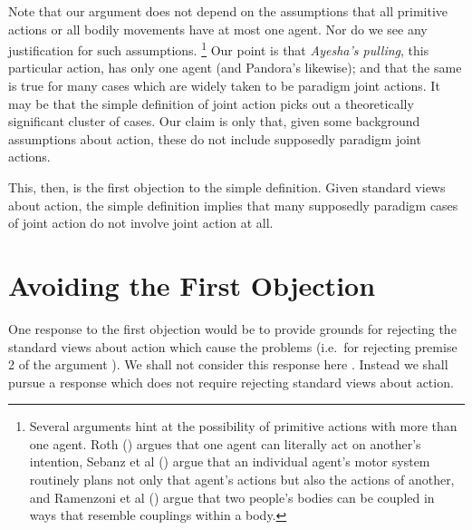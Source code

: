\documentclass[12pt,a4paper]{extarticle}
\begin{document}
Note that our argument does not depend on the assumptions that all primitive actions or all bodily movements have at most one agent.
Nor do we see any justification for such assumptions.%
%
\footnote{
Several arguments hint at the possibility of primitive actions with more than one agent.
Roth (\citeyear{Roth:2004ki}) argues that one agent can literally act on another's intention,
Sebanz et al (\citeyear{Sebanz:2005fk}) argue that an individual agent's motor system routinely plans not only that agent's actions but also the actions of another,
and 
Ramenzoni et al (\citeyear{ramenzoni_joint_2011}) argue that two people's bodies can be coupled in ways that resemble  couplings within a body. 
}
%
Our point is that \emph{Ayesha's pulling}, this particular action, has only one agent  (and Pandora's likewise); and that the same is true for many cases which are widely taken to be paradigm  joint actions.
It may be that the simple definition of joint action picks out a theoretically significant cluster of cases.
Our claim is only that, given some background assumptions about action, these do not include supposedly paradigm joint actions.


This, then, is the first objection to the simple definition.
Given standard views about action, the simple definition implies that many supposedly paradigm cases of joint action do not involve joint action at all.

\label{end_section_first_objection}


\section{Avoiding the First Objection}
	\label{section_revised_simple_definition}
	\label{section_grounding}

One response to the first objection would be to provide grounds for rejecting the standard views about action which cause the problems (i.e.\ for rejecting premise 2 of the argument ).
We shall not consider this response here \citep[but see][]{chant_special_2006,chant_unintentional_2007}.
Instead we shall pursue a response which does not require rejecting standard views about action.
\end{document}
